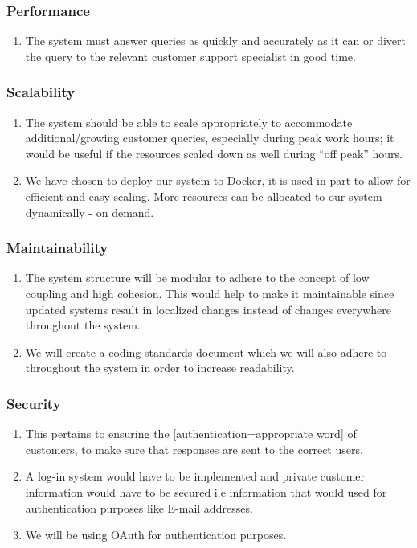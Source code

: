 \documentclass[11pt]{article}
\begin{document}

\subsubsection{Performance}
\begin{enumerate}
	\item The system must answer queries as quickly and accurately as it can or divert the query to the relevant customer support specialist in good time. 
\end{enumerate}

\subsubsection{Scalability}
\begin{enumerate}
	\item The system should be able to scale appropriately to accommodate additional/growing customer queries, especially during peak work hours; it would be useful if the resources scaled down as well during “off peak” hours.
	\item We have chosen to deploy our system to Docker, it is used in part to allow for efficient and easy scaling. More resources can be allocated to our system dynamically - on demand.
\end{enumerate}

\subsubsection{Maintainability}
\begin{enumerate}
	\item The system structure will be modular to adhere to the concept of low coupling and high cohesion. This would help to make it maintainable since updated systems result in localized changes instead of changes everywhere throughout the system.
	\item We will create a coding standards document which we will also adhere to throughout the system in order to increase readability.
\end{enumerate}

\subsubsection{Security}
\begin{enumerate}
	\item This pertains to ensuring the [authentication=appropriate word] of customers, to make sure that responses are sent to the correct users.
	\item A log-in system would have to be implemented and private customer information would have to be secured i.e information that would used for authentication purposes like E-mail addresses.
	\item We will be using OAuth for authentication purposes.
\end{enumerate}
\end{document}
